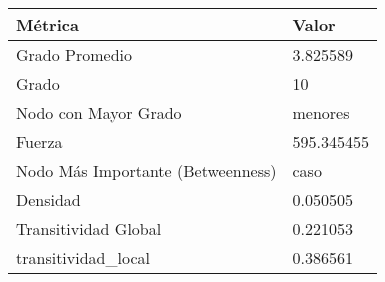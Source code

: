 \begin{tabular}{ll}
\toprule
Métrica & Valor \\
\midrule
Grado Promedio & 3.825589 \\
Grado & 10 \\
Nodo con Mayor Grado & menores \\
Fuerza & 595.345455 \\
Nodo Más Importante (Betweenness) & caso \\
Densidad & 0.050505 \\
Transitividad Global & 0.221053 \\
transitividad_local & 0.386561 \\
\bottomrule
\end{tabular}
